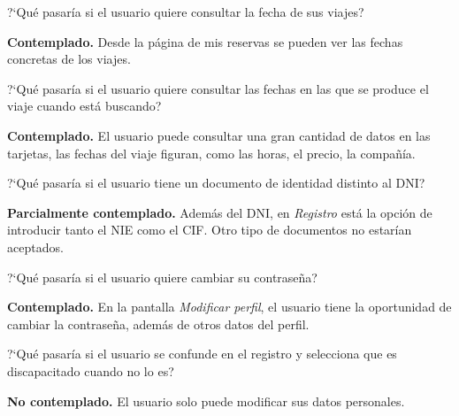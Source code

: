\begin{escenario}
    \centering
    ?`Qué pasaría si el usuario quiere consultar la fecha de sus viajes?

    \begin{solucion}
        \centering
        \textbf{Contemplado.} Desde la página de mis reservas se pueden ver las fechas concretas de los viajes.
    \end{solucion}
\end{escenario}

\begin{escenario}
    \centering
    ?`Qué pasaría si el usuario quiere consultar las fechas en las que se produce el viaje cuando está buscando?

    \begin{solucion}
        \centering
        \textbf{Contemplado.} El usuario puede consultar una gran cantidad de datos en las tarjetas, las fechas del viaje figuran, como las horas, el precio, la compañía.
    \end{solucion}
\end{escenario}

\begin{escenario} %
    \centering
    ?`Qué pasaría si el usuario tiene un documento de identidad distinto al DNI?

    \begin{solucion}
        \centering
        \textbf{Parcialmente contemplado.} Además del DNI, en \textit{Registro} está la opción de introducir tanto el NIE como el CIF. Otro tipo de documentos no estarían aceptados.
    \end{solucion}
\end{escenario}

\begin{escenario} %
    \centering
    ?`Qué pasaría si el usuario quiere cambiar su contraseña?

    \begin{solucion}
        \centering
        \textbf{Contemplado.} En la pantalla \textit{Modificar perfil}, el usuario tiene la oportunidad de cambiar la contraseña, además de otros datos del perfil.
    \end{solucion}
\end{escenario}

\begin{escenario} %
    \centering
    ?`Qué pasaría si el usuario se confunde en el registro y selecciona que es discapacitado cuando no lo es?

    \begin{solucion}
        \centering
        \textbf{No contemplado.} El usuario solo puede modificar sus datos personales.
    \end{solucion}
\end{escenario}

